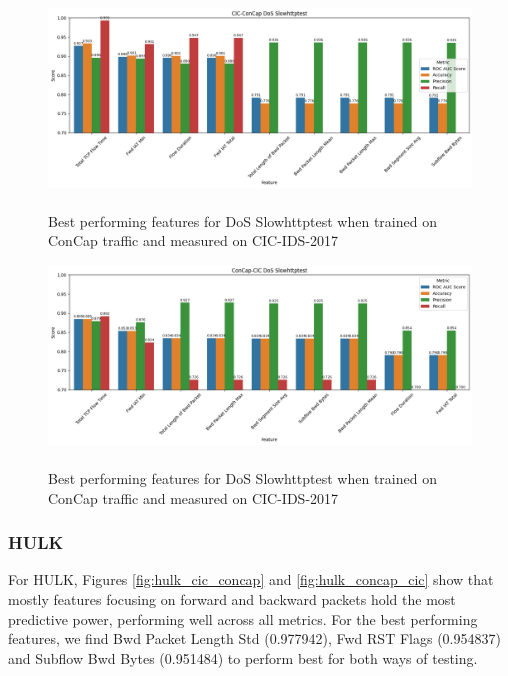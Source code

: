 \begin{figure}
	\centering
	\includegraphics[width=1.2\linewidth]{images/slowhttptest_cic_concap}
	\caption{\\Best performing features for DoS Slowhttptest when trained on ConCap traffic and measured on CIC-IDS-2017}
	\label{fig:slowhttptest_cic_concap}
\end{figure}
\begin{figure}
	\centering
	\includegraphics[width=1.2\linewidth]{images/slowhttptest_concap_cic}
	\caption{\\Best performing features for DoS Slowhttptest when trained on ConCap traffic and measured on CIC-IDS-2017}
	\label{fig:slowhttptest_concap_cic}
\end{figure}


\subsubsection{HULK}
For HULK, Figures \ref{fig:hulk_cic_concap} and \ref{fig:hulk_concap_cic} show that mostly features focusing on forward and backward packets hold the most predictive power, performing well across all metrics. For the best performing features, we find Bwd Packet Length Std (0.977942), Fwd RST Flags (0.954837) and Subflow Bwd Bytes (0.951484) to perform best for both ways of testing.


